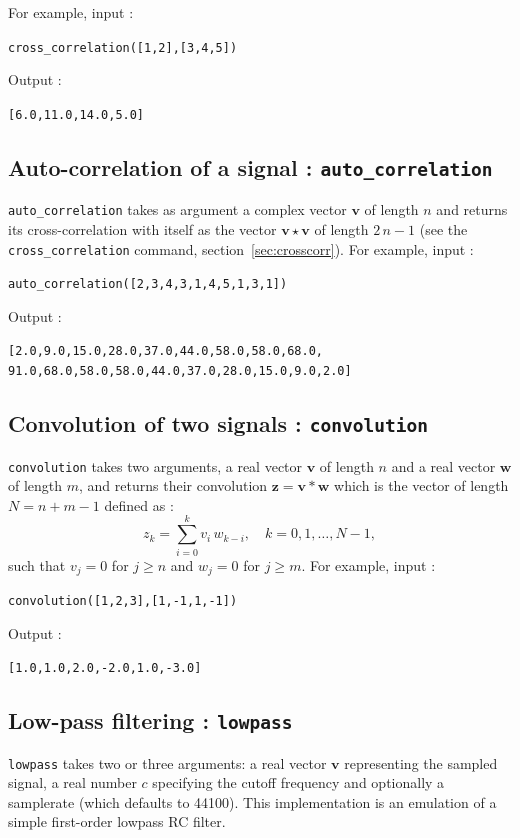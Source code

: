 \documentclass[a4paper,11pt]{book}
\begin{document}
For example, input :
\begin{center}
	{\tt cross\_correlation([1,2],[3,4,5])}
\end{center}
Output :
\begin{center}
	{\tt [6.0,11.0,14.0,5.0]}
\end{center}

\subsection{Auto-correlation of a signal : {\tt auto\_correlation}}
{\tt auto\_correlation} takes as argument a complex vector $ \mathbf{v} $ of length $ n $ and returns its cross-correlation with itself as the vector $ \mathbf{v}\star\mathbf{v} $ of length $ 2\,n-1 $ (see the {\tt cross\_correlation} command, section~\ref{sec:crosscorr}). For example, input :
\begin{center}
	{\tt auto\_correlation([2,3,4,3,1,4,5,1,3,1])}
\end{center}
Output :
\begin{center}
	{\tt [2.0,9.0,15.0,28.0,37.0,44.0,58.0,58.0,68.0,\\
		91.0,68.0,58.0,58.0,44.0,37.0,28.0,15.0,9.0,2.0]}
\end{center}

\subsection{Convolution of two signals : {\tt convolution}}
{\tt convolution} takes two arguments, a real vector $ \mathbf{v} $ of length $ n $ and a real vector $ \mathbf{w} $ of length $ m $, and returns their convolution $ \mathbf{z}=\mathbf{v}\ast\mathbf{w} $ which is the vector of length $ N=n+m-1 $ defined as :
\[ z_k=\sum_{i=0}^{k}v_i\,w_{k-i},\quad k=0,1,\dots,N-1, \]
such that $ v_j=0 $ for $ j\geq n $ and $ w_j=0 $ for $ j\geq m $. For example, input :
\begin{center}
	{\tt convolution([1,2,3],[1,-1,1,-1])}
\end{center}
Output :
\begin{center}
	{\tt [1.0,1.0,2.0,-2.0,1.0,-3.0]}
\end{center}

\subsection{Low-pass filtering : {\tt lowpass}}
{\tt lowpass} takes two or three arguments: a real vector $ \mathbf{v} $ representing the sampled signal, a real number $ c $ specifying the cutoff frequency and optionally a samplerate (which defaults to 44100). This implementation is an emulation of a simple first-order lowpass RC filter.
\end{document}
